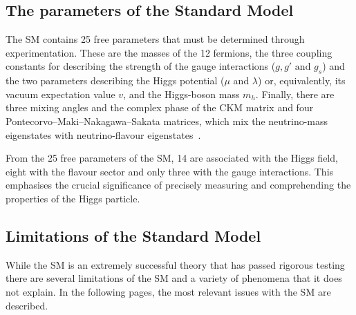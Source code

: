 \subsection{The parameters of the Standard Model}
\label{sec:chap1:Wrapup:ParamsOfSM}
The SM contains 25 free parameters that must be determined through experimentation. 
These are the masses of the 12 fermions, %
%	
the three coupling constants for describing the strength of the gauge interactions ($g, g' \textrm{ and } g_{s}$)
 and the two parameters describing the Higgs potential ($\mu$ and $\lambda$) or, equivalently, its vacuum  
expectation value $v$, and the Higgs-boson mass $m_{h}$.
Finally, there are three mixing angles and the complex phase of the CKM matrix and four 
Pontecorvo--Maki--Nakagawa--Sakata matrices, %
which mix the neutrino-mass eigenstates with neutrino-flavour eigenstates~\cite{Maki:1962lba, Pontecorvo:1957qd}.

From the 25 free parameters of the SM, 14 are associated with the Higgs field, eight with the flavour sector and
only three with the gauge interactions. This emphasises the crucial significance of precisely measuring and 
comprehending the properties of the Higgs particle.

\subsection{Limitations of the Standard Model}
\label{sec:chap1:SM_problems}
While the SM is an extremely successful theory that has passed rigorous testing %
there are several limitations of the SM and a variety of phenomena that it does not explain. %
In the following pages, the most relevant issues with the SM are described.

